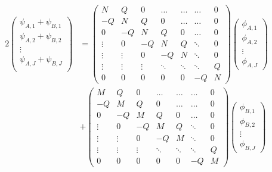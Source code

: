 \begin{align}
    \label{eq:temporaryEquation}
    2\begin{pmatrix}
         \psi_{A,1} + \psi_{B,1} \\
         \psi_{A,2} + \psi_{B,2} \\
         \vdots                  \\
         \psi_{A,J} + \psi_{B,J} \\
    \end{pmatrix} &=
    \begin{pmatrix}
        N      & Q      & 0      & \ldots & \ldots & \ldots & 0 \\
        -Q     & N      & Q      & 0      & \ldots & \ldots & 0 \\
        0      & -Q     & N      & Q      & 0      & \ldots & 0 \\
        \vdots & 0      & -Q     & N      & Q      & \ddots & 0 \\
        \vdots & \vdots & 0      & -Q     & N      & \ddots & 0 \\
        \vdots & \vdots & \vdots & \ddots & \ddots & \ddots & Q \\
        0      & 0      & 0      & 0      & 0      & -Q     & N
    \end{pmatrix}\begin{pmatrix}
                     \phi_{A,1} \\
                     \phi_{A,2} \\
                     \vdots     \\
                     \phi_{A,J}
    \end{pmatrix}\\
    &+\begin{pmatrix}
          M      & Q      & 0      & \ldots & \ldots & \ldots & 0 \\
          -Q     & M      & Q      & 0      & \ldots & \ldots & 0 \\
          0      & -Q     & M      & Q      & 0      & \ldots & 0 \\
          \vdots & 0      & -Q     & M      & Q      & \ddots & 0 \\
          \vdots & \vdots & 0      & -Q     & M      & \ddots & 0 \\
          \vdots & \vdots & \vdots & \ddots & \ddots & \ddots & Q \\
          0      & 0      & 0      & 0      & 0      & -Q     & M
    \end{pmatrix}\begin{pmatrix}
                     \phi_{B,1} \\
                     \phi_{B,2} \\
                     \vdots     \\
                     \phi_{B,J}
    \end{pmatrix}
\end{align}


